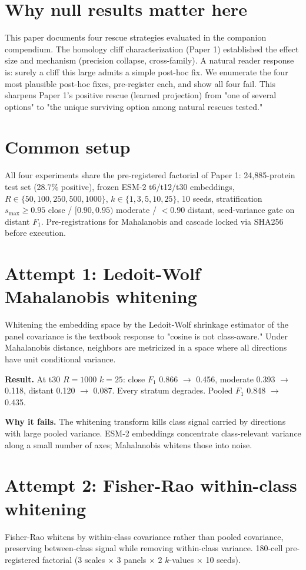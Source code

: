\documentclass[11pt]{article}
\begin{document}
\section{Why null results matter here}
This paper documents four rescue strategies evaluated in the companion compendium. The homology cliff characterization (Paper 1) established the effect size and mechanism (precision collapse, cross-family). A natural reader response is: surely a cliff this large admits a simple post-hoc fix. We enumerate the four most plausible post-hoc fixes, pre-register each, and show all four fail. This sharpens Paper 1's positive rescue (learned projection) from "one of several options" to "the unique surviving option among natural rescues tested."

\section{Common setup}
All four experiments share the pre-registered factorial of Paper 1: 24{,}885-protein test set (28.7\% positive), frozen ESM-2 t6/t12/t30 embeddings, $R \in \{50,100,250,500,1000\}$, $k \in \{1,3,5,10,25\}$, 10 seeds, stratification $s_{\max} \ge 0.95$ close / $[0.90,0.95)$ moderate / $<0.90$ distant, seed-variance gate on distant $F_1$. Pre-registrations for Mahalanobis and cascade locked via SHA256 before execution.


\section{Attempt 1: Ledoit-Wolf Mahalanobis whitening}
Whitening the embedding space by the Ledoit-Wolf shrinkage estimator \cite{ledoit2004} of the panel covariance is the textbook response to "cosine is not class-aware." Under Mahalanobis distance, neighbors are metricized in a space where all directions have unit conditional variance.

\textbf{Result.} At t30 $R=1000$ $k=25$: close $F_1$ 0.866 $\to$ 0.456, moderate 0.393 $\to$ 0.118, distant 0.120 $\to$ 0.087. Every stratum degrades. Pooled $F_1$ 0.848 $\to$ 0.435.

\textbf{Why it fails.} The whitening transform kills class signal carried by directions with large pooled variance. ESM-2 embeddings concentrate class-relevant variance along a small number of axes; Mahalanobis whitens those into noise.

\section{Attempt 2: Fisher-Rao within-class whitening}
Fisher-Rao \cite{amari2016} whitens by within-class covariance rather than pooled covariance, preserving between-class signal while removing within-class variance. 180-cell pre-registered factorial (3 scales $\times$ 3 panels $\times$ 2 $k$-values $\times$ 10 seeds).
\end{document}
